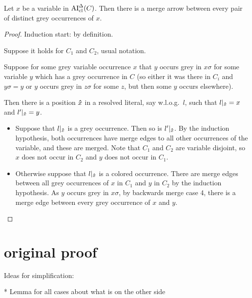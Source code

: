 \documentclass[,%
	paper=a4,%
	DIV11, %
	twoside=false,%
	liststotoc,
	bibtotoc,
	draft=false,%
	numbers=noendperiod
]{scrartcl}
\begin{document}
\begin{lemma}
	\label{lemma:arrow_from_grey_to_grey}
	Let $x$ be a variable in $\operatorname{AI}_\mathrm{cl}^\Delta(C)$.
	Then there is a merge arrow between every pair of distinct grey occurrences of $x$. 
\end{lemma}
\begin{proof}
	Induction start: by definition.

	Suppose it holds for $C_1$ and $C_2$, usual notation.

	Suppose for some grey variable occurrence $x$ that $y$ occurs grey in $x\sigma$ for some variable $y$ which has a grey occurrence in $C$ (so either it was there in $C_i$ and $y\sigma = y$ or $y$ occurs grey in $z\sigma$ for some $z$, but then some $y$ occurs elsewhere). 

	Then there is a position $\bm\hat x$ in a resolved literal, say w.l.o.g.\ $l$, such that $l|_{\bm\hat x} = x$ and $l'|_{\bm\hat x} = y$.

	\begin{itemize}
		\item
			Suppose that $l|_{\bm\hat x}$ is a grey occurrence.
			Then so is $l'|_{\bm\hat x}$.
			By the induction hypothesis, both occurrences have merge edges to all other occurrences of the variable, and these are merged.
			Note that $C_1$ and $C_2$ are variable disjoint, so $x$ does not occur in $C_2$ and $y$ does not occur in $C_1$.

		\item
			Otherwise suppose that $l|_{\bm\hat x}$ is a colored occurrence.
			There are merge edges between all grey occurrences of $x$ in $C_1$ and $y$ in $C_2$ by the induction hypothesis.
			As $y$ occurs grey in $x\sigma$, by backwards merge case 4, there is a merge edge between every grey occurrence of $x$ and $y$.
			\qedhere
	\end{itemize}

\end{proof}

\section{original proof}

Ideas for simplification:

* Lemma for all cases about what is on the other side
\end{document}
